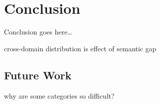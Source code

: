 \chapter{Conclusion}\label{ch:conclusion}

Conclusion goes here\dots

cross-domain distribution is effect of semantic gap

\section{Future Work}

why are some categories so difficult?
